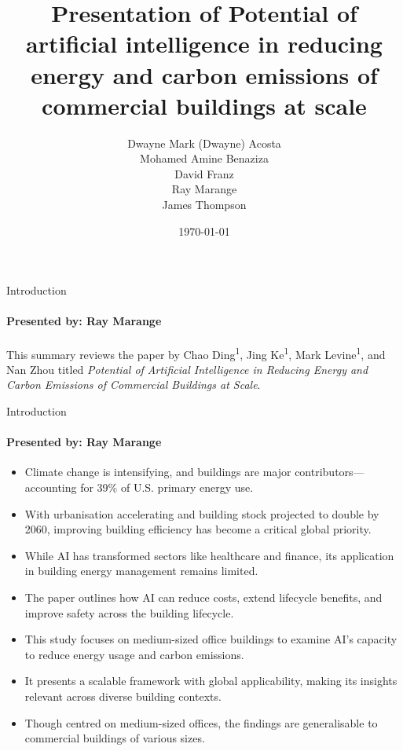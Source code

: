 \documentclass{beamer}
\title{Presentation of Potential of artificial intelligence in reducing energy and carbon emissions of commercial buildings at scale}
\author{Dwayne Mark (Dwayne) Acosta \\ Mohamed Amine Benaziza \\ David Franz \\ Ray Marange \\ James Thompson}
\date{\today}
\begin{document}
\frame{\titlepage}

\begin{frame}{Introduction}
\framesubtitle{Presented by: Ray Marange}

This summary reviews the paper by Chao Ding\textsuperscript{1}, Jing Ke\textsuperscript{1}, Mark Levine\textsuperscript{1}, and Nan Zhou titled \textit{Potential of Artificial Intelligence in Reducing Energy and Carbon Emissions of Commercial Buildings at Scale}.


\end{frame}

\begin{frame}{Introduction}
\framesubtitle{Presented by: Ray Marange}

\begin{itemize}
    \item Climate change is intensifying, and buildings are major contributors—accounting for 39\% of U.S. primary energy use.
    \item With urbanisation accelerating and building stock projected to double by 2060, improving building efficiency has become a critical global priority.
    \item While AI has transformed sectors like healthcare and finance, its application in building energy management remains limited.
    \item The paper outlines how AI can reduce costs, extend lifecycle benefits, and improve safety across the building lifecycle.
    \item This study focuses on medium-sized office buildings to examine AI’s capacity to reduce energy usage and carbon emissions.
    \item It presents a scalable framework with global applicability, making its insights relevant across diverse building contexts.
    \item Though centred on medium-sized offices, the findings are generalisable to commercial buildings of various sizes.
\end{itemize}

\end{frame}
\end{document}
